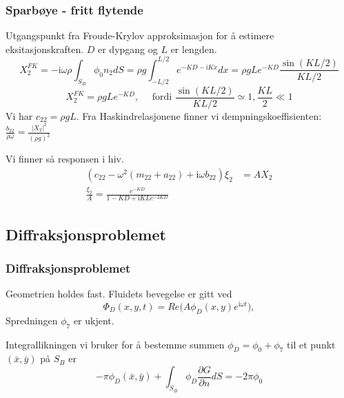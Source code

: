 \documentclass{beamer}
\begin{document}
\begin{frame}
\frametitle{Sparbøye - fritt flytende} 
Utgangspunkt fra Froude-Krylov approksimasjon for å estimere eksitasjonskraften. $D$ er dypgang og $L$ er lengden. %
\begin{equation}
	X_2^{FK} = - \mathrm{i} \omega \rho \int_{S_B} \phi_0 n_2 dS = \rho g \int_{-L/2}^{L/2} e^{-KD- \mathrm{i}Kx} dx = \rho g L e^{-KD} \frac{\sin(KL/2)}{KL/2} 
\end{equation}
\begin{equation} 
	X_2^{FK} = \rho g L e^{-KD} , \quad \text{ fordi } \frac{\sin(KL/2)}{KL/2} \simeq 1,  \frac{KL}{2} \ll 1
\end{equation}
Vi har 
$c_{22} = \rho g L$. Fra Haskindrelasjonene finner vi dempningskoeffisienten: $\frac{b_{22}}{\rho \omega} = \frac{|X_2|^2 }{(\rho g)^2}$

Vi finner så responsen i hiv. 
\begin{align}
	(c_{22} - \omega^2(m_{22} + a_{22}) + \mathrm{i}\omega b_{22})\xi_2 &= AX_2 \\
	 \frac{\xi_{2}}{A} = \frac{ e^{-KD}}{ 1 - K D + \mathrm{i} K {L} e^{-2KD} }
\end{align}
\end{frame}


\subsection{Diffraksjonsproblemet}
\begin{frame}
 \frametitle{Diffraksjonsproblemet}
Geometrien holdes fast. Fluidets bevegelse er gitt ved 
\begin{equation}
\Phi_D(x,y,t) = Re\Big(A  \phi_D(x,y) e^{\mathrm{i} \omega t} \Big), 
\end{equation}
Spredningen $\phi_7$ er ukjent.

Integrallikningen vi bruker for å bestemme summen $\phi_D =  \phi_0 +  \phi_7$ til et punkt $(\bar{x},\bar{y})$ på $S_B$ er
\begin{equation}
    -\pi \phi_D(\bar{x},\bar{y})  + \int_{S_B}   \phi_D  \frac{\partial G }{\partial n}dS = -2\pi \phi_0
\end{equation}
\end{frame}
\end{document}
